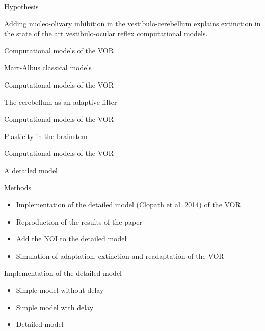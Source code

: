 \documentclass[ignorenonframetext,]{beamer}
\begin{document}
\begin{frame}{Hypothesis}

Adding nucleo-olivary inhibition in the vestibulo-cerebellum explains
extinction in the state of the art vestibulo-ocular reflex computational
models.

\end{frame}

\begin{frame}{Computational models of the VOR}

Marr-Albus classical models

\end{frame}

\begin{frame}{Computational models of the VOR}

The cerebellum as an adaptive filter

\end{frame}

\begin{frame}{Computational models of the VOR}

Plasticity in the brainstem

\end{frame}

\begin{frame}{Computational models of the VOR}

A detailed model

\end{frame}

\begin{frame}{Methods}

\begin{itemize}
\itemsep1pt\parskip0pt
\item
  Implementation of the detailed model (Clopath et al. 2014) of the VOR
\item
  Reproduction of the results of the paper
\item
  Add the NOI to the detailed model
\item
  Simulation of adaptation, extinction and readaptation of the VOR
\end{itemize}

\end{frame}

\begin{frame}{Implementation of the detailed model}

\begin{itemize}
\itemsep1pt\parskip0pt
\item
  Simple model without delay
\item
  Simple model with delay
\item
  Detailed model
\end{itemize}

\end{frame}
\end{document}
